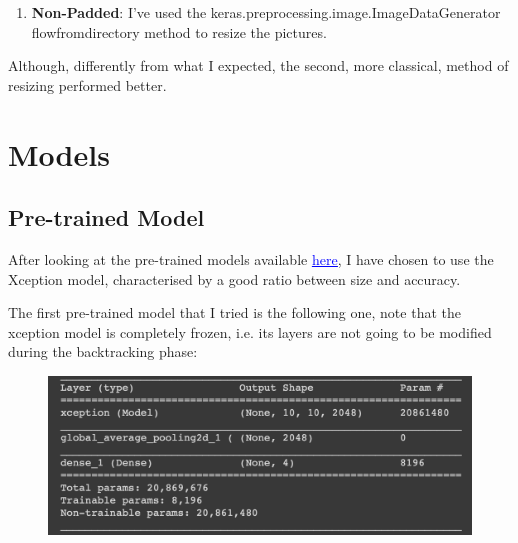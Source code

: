\documentclass[a4paper]{article}
\begin{document}
\begin{enumerate}
\begin{figure} [h!]
\begin{subfigure}{0.5\textwidth}
  \caption{Resized picture with resolution 299x299}
  \label{fig:sub2}
\end{subfigure}
\label{fig:test}
\end{figure}

\item \textbf{Non-Padded}: I've used the keras.preprocessing.image.ImageDataGenerator flow\textunderscore from\textunderscore directory method to resize the pictures.
\end{enumerate}

Although, differently from what I expected, the second, more classical, method of resizing performed better.
\section{Models}
\subsection{Pre-trained Model}
After looking at the pre-trained models available \href{https://keras.io/applications}{\textcolor{blue}{\underline{here}}}, I have chosen to use the Xception model, characterised by a good ratio between size and accuracy.

The first pre-trained model that I tried is the following one, note that the xception model is completely frozen, i.e. its layers are not going to be modified during the backtracking phase: 
\begin{figure} [h!]
\centering
\includegraphics[width=\textwidth]{first_model.png}
\label{fig: first_model}
\end{figure}
\end{document}
